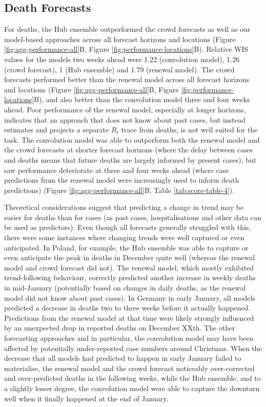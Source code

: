 \documentclass[
]{article}
\begin{document}
\hypertarget{death-forecasts}{%
\subsection{Death Forecasts}\label{death-forecasts}}

For deaths, the Hub ensemble outperformed the crowd forecasts as well as our model-based approaches across all forecast horizons and locations (Figure \ref{fig:agg-performance-all}B, Figure \ref{fig:performance-locations}B). Relative WIS values for the models two weeks ahead were 1.22 (convolution model), 1.26 (crowd forecast), 1 (Hub ensemble) and 1.79 (renewal model). The crowd forecasts performed better than the renewal model across all forecast horizons and locations (Figure \ref{fig:agg-performance-all}B, Figure \ref{fig:performance-locations}B), and also better than the convolution model three and four weeks ahead. Poor performance of the renewal model, especially at longer horizons, indicates that an approach that does not know about past cases, but instead estimates and projects a separate \(R_t\) trace from deaths, is not well suited for the task. The convolution model was able to outperform both the renewal model and the crowd forecasts at shorter forecast horizons (where the delay between cases and deaths means that future deaths are largely informed by present cases), but saw performance deteriorate at three and four weeks ahead (where case predictions from the renewal model were increasingly used to inform death predictions) (Figure \ref{fig:agg-performance-all}B, Table \ref{tab:score-table-4}).

Theoretical considerations suggest that predicting a change in trend may be easier for deaths than for cases (as past cases, hospitalisations and other data can be used as predictors). Even though all forecasts generally struggled with this, there were some instances where changing trends were well captured or even anticipated. In Poland, for example, the Hub ensemble was able to capture or even anticipate the peak in deaths in December quite well (whereas the renewal model and crowd forecast did not). The renewal model, which mostly exhibited trend-following behaviour, correctly predicted another increase in weekly deaths in mid-January (potentially based on changes in daily deaths, as the renewal model did not know about past cases). In Germany in early January, all models predicted a decrease in deaths two to three weeks before it actually happened. Predictions from the renewal model at that time were likely strongly influenced by an unexpected drop in reported deaths on December XXth. The other forecasting approaches and in particular, the convolution model may have been affected by potentially under-reported case numbers around Christmas. When the decrease that all models had predicted to happen in early January failed to materialise, the renewal model and the crowd forecast noticeably over-corrected and over-predicted deaths in the following weeks, while the Hub ensemble, and to a slightly lesser degree, the convolution model were able to capture the downturn well when it finally happened at the end of January.
\end{document}
